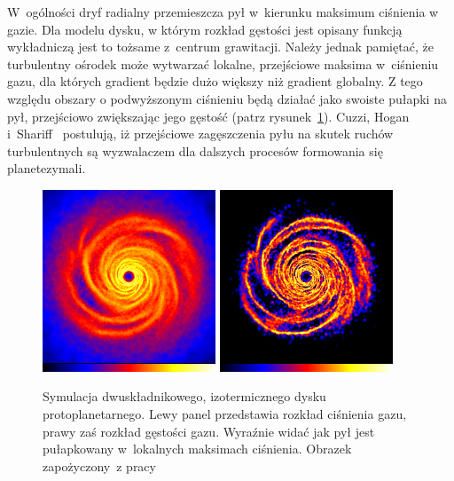 \par W~ogólności dryf radialny przemieszcza pył w~kierunku maksimum ciśnienia w
gazie. Dla modelu dysku, w którym rozkład gęstości jest opisany funkcją
wykładniczą jest to tożsame z~centrum grawitacji. Należy jednak pamiętać, że
turbulentny ośrodek może wytwarzać lokalne, przejściowe maksima w~ciśnieniu
gazu, dla których gradient będzie dużo większy niż gradient globalny. Z tego
względu obszary o podwyższonym ciśnieniu będą działać jako swoiste pułapki na
pył, przejściowo zwiększając jego gęstość (patrz rysunek~\ref{fig:chap1_trap}).
Cuzzi, Hogan i~Shariff~\citep{CHS08} postulują, iż przejściowe zagęszczenia pyłu
na skutek ruchów turbulentnych są wyzwalaczem dla dalszych procesów formowania
się planetezymali.
%
\begin{figure}
   \centering
   \includegraphics[width=0.46\textwidth]{figures/chap1_gasdisk.png}
   \includegraphics[width=0.46\textwidth]{figures/chap1_dustdisk.png}
   \caption[Pułupakowanie pyłu w lokalnych maksimach ciśnienia gazu.]
     {Symulacja dwuskładnikowego, izotermicznego dysku
      pro\-to\-pla\-ne\-tar\-ne\-go.
      Lewy panel przedstawia rozkład ciśnienia gazu, prawy zaś rozkład gęstości
      gazu. Wy\-raź\-nie widać jak pył jest pułapkowany w~lokalnych maksimach
      ciśnienia. Obrazek za\-po\-ży\-czo\-ny~z pracy~\cite{RLP2006}}
   \label{fig:chap1_trap}
\end{figure}


